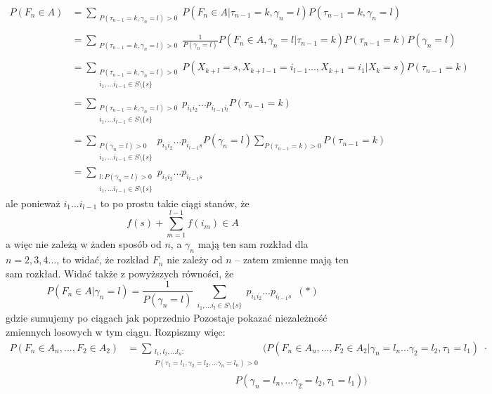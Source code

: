 \documentclass[a4paper]{article}
\begin{document}
\begin{align*}
 P(F_n \in A) &= \sum\limits_{\substack{P(\tau_{n-1} = k, \gamma_{n} = l) > 0}} P(F_n \in A |\tau_{n-1} = k, \gamma_{n} = l)P(\tau_{n-1} = k, \gamma_{n} = l)\\\\
 &=\sum\limits_{\substack{P(\tau_{n-1} = k, \gamma_{n} = l) > 0}} \frac{1}{P(\gamma_{n} = l)} P(F_n \in A, \gamma_{n} = l |\tau_{n-1} = k)P(\tau_{n-1} = k) P(\gamma_{n} = l)\\\\
 &=\sum\limits_{\substack{P(\tau_{n-1} = k, \gamma_{n} = l) > 0\\i_1, ... i_{l-1} \in S\setminus \{s\}}} P(X_{k+l} = s, X_{k+l-1} = i_{l-1} ..., X_{k+1} = i_1|X_{k} = s)P(\tau_{n-1} = k)\\\\
 &= \sum\limits_{\substack{P(\tau_{n-1} = k, \gamma_{n} = l) > 0\\i_1, ... i_{l-1} \in S\setminus \{s\}}} p_{i_1 i_2} ... p_{i_{l-1}i_l}P(\tau_{n-1} = k) \\\\
 &=\sum\limits_{\substack{P(\gamma_{n} = l) > 0\\i_1, ... i_{l-1} \in S\setminus \{s\}}} p_{i_1 i_2} ... p_{i_{l-1}s}P(\gamma_n = l) \sum\limits_{P(\tau_{n-1} = k) > 0} P(\tau_{n-1} = k)\\
 &= \sum\limits_{\substack{l: P(\gamma_{n} = l) > 0\\i_1, ... i_{l-1} \in S\setminus \{s\}}} p_{i_1 i_2} ... p_{i_{l-1}s}
\end{align*}
ale ponieważ $i_1 ... i_{l-1}$ to po prostu takie ciągi stanów, że $$f(s) + \sum\limits_{m = 1}^{l-1} f(i_m) \in A$$
a więc nie zależą w żaden sposób od $n$, a $\gamma_n$ mają ten sam rozkład dla $n=2,3,4...$, to widać, że rozkład $F_n$ nie zależy od $n$ – zatem zmienne mają ten sam rozkład. Widać także z powyższych równości, że $$P(F_n \in A|\gamma_n = l) = \frac{1}{P(\gamma_{n} = l)} \sum\limits_{\substack{i_1, ... i_{l} \in S \setminus \{s\} }} p_{i_1 i_2} ... p_{i_{l-1}s}\,\,\,(*)$$
gdzie sumujemy po ciągach jak poprzednio
Pozostaje pokazać niezależność zmiennych losowych w tym ciągu. Rozpiszmy więc:
\begin{align*}
    P(F_n \in A_n, ..., F_2 \in A_2) &= \sum\limits_{\substack{l_1, l_2, ... l_n:\\P(\tau_1 = l_1, \gamma_2 = l_2, ... \gamma_n = l_n) > 0}}(P(F_n \in A_n, ..., F_2 \in A_2|\gamma_n = l_n ... \gamma_2 = l_2, \tau_1 = l_1)\,\, \cdot \\
    &\quad\quad\quad\quad\quad\quad\quad\quad\quad\quad\quad P(\gamma_n = l_n, ... \gamma_2 = l_2, \tau_1 = l_1))
\end{align*}
\end{document}
